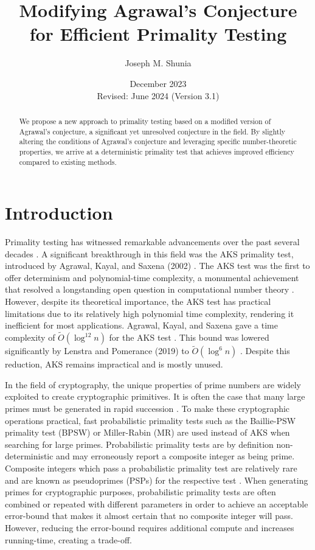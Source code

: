 \documentclass{article}
\title{Modifying Agrawal's Conjecture for Efficient Primality Testing}
\author{Joseph M. Shunia}
\date{December 2023 \\ \small Revised: June 2024 (Version 3.1) \normalsize}
\theoremstyle{plain}
\theoremstyle{definition}
\begin{document}
\maketitle

\begin{abstract}
We propose a new approach to primality testing based on a modified version of Agrawal's conjecture, a significant yet unresolved conjecture in the field. By slightly altering the conditions of Agrawal's conjecture and leveraging specific number-theoretic properties, we arrive at a deterministic primality test that achieves improved efficiency compared to existing methods.
\end{abstract}

\section{Introduction}
Primality testing has witnessed remarkable advancements over the past several decades \cite{miller1976, baillie1980, rabin1980, wagstaff1982pseudoprimes, aks2002}. A significant breakthrough in this field was the AKS primality test, introduced by Agrawal, Kayal, and Saxena (2002) \cite{aks2002}. The AKS test was the first to offer determinism and polynomial-time complexity, a monumental achievement that resolved a longstanding open question in computational number theory \cite{goldreich2008}. However, despite its theoretical importance, the AKS test has practical limitations due to its relatively high polynomial time complexity, rendering it inefficient for most applications. Agrawal, Kayal, and Saxena gave a time complexity of $\tilde{O}(\log^{12} n)$ for the AKS test \cite{aks2002}. This bound was lowered significantly by Lenstra and Pomerance (2019) to $\tilde{O}(\log^6 n)$ \cite{lenstra2019gaussian}. Despite this reduction, AKS remains impractical and is mostly unused.

In the field of cryptography, the unique properties of prime numbers are widely exploited to create cryptographic primitives. It is often the case that many large primes must be generated in rapid succession \cite{lenstra1987elliptic}. To make these cryptographic operations practical, fast probabilistic primality tests such as the Baillie-PSW primality test (BPSW) \cite{baillie1980} or Miller-Rabin (MR) \cite{miller1976, rabin1980} are used instead of AKS when searching for large primes. Probabilistic primality tests are by definition non-deterministic and may erroneously report a composite integer as being prime. Composite integers which pass a probabilistic primality test are relatively rare and are known as pseudoprimes (PSPs) for the respective test \cite{wagstaff1982pseudoprimes}. When generating primes for cryptographic purposes, probabilistic primality tests are often combined or repeated with different parameters in order to achieve an acceptable error-bound that makes it almost certain that no composite integer will pass. However, reducing the error-bound requires additional compute and increases running-time, creating a trade-off.
\end{document}

